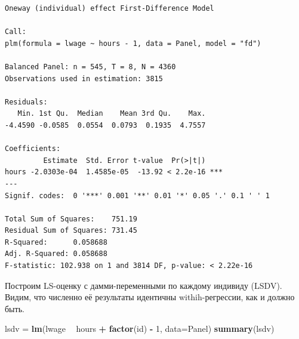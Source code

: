 \documentclass[]{book}
\newenvironment{Shaded}{\begin{snugshade}}{\end{snugshade}}
\newcommand{\DataTypeTok}[1]{\textcolor[rgb]{0.13,0.29,0.53}{#1}}
\newcommand{\DecValTok}[1]{\textcolor[rgb]{0.00,0.00,0.81}{#1}}
\newcommand{\KeywordTok}[1]{\textcolor[rgb]{0.13,0.29,0.53}{\textbf{#1}}}
\newcommand{\NormalTok}[1]{#1}
\newcommand{\OperatorTok}[1]{\textcolor[rgb]{0.81,0.36,0.00}{\textbf{#1}}}
\newcommand{\StringTok}[1]{\textcolor[rgb]{0.31,0.60,0.02}{#1}}
\begin{document}
\begin{verbatim}
Oneway (individual) effect First-Difference Model

Call:
plm(formula = lwage ~ hours - 1, data = Panel, model = "fd")

Balanced Panel: n = 545, T = 8, N = 4360
Observations used in estimation: 3815

Residuals:
   Min. 1st Qu.  Median    Mean 3rd Qu.    Max. 
-4.4590 -0.0585  0.0554  0.0793  0.1935  4.7557 

Coefficients:
         Estimate  Std. Error t-value  Pr(>|t|)    
hours -2.0303e-04  1.4585e-05  -13.92 < 2.2e-16 ***
---
Signif. codes:  0 '***' 0.001 '**' 0.01 '*' 0.05 '.' 0.1 ' ' 1

Total Sum of Squares:    751.19
Residual Sum of Squares: 731.45
R-Squared:      0.058688
Adj. R-Squared: 0.058688
F-statistic: 102.938 on 1 and 3814 DF, p-value: < 2.22e-16
\end{verbatim}

Построим LS-оценку с дамми-переменными по каждому индивиду (LSDV). Видим, что численно её результаты идентичны withih-регрессии, как и должно быть.

\begin{Shaded}
\begin{Highlighting}[]
\NormalTok{lsdv =}\StringTok{ }\KeywordTok{lm}\NormalTok{(lwage }\OperatorTok{~}\StringTok{ }\NormalTok{hours }\OperatorTok{+}\StringTok{ }\KeywordTok{factor}\NormalTok{(id) }\OperatorTok{-}\StringTok{ }\DecValTok{1}\NormalTok{, }\DataTypeTok{data=}\NormalTok{Panel)}
\KeywordTok{summary}\NormalTok{(lsdv)}
\end{Highlighting}
\end{Shaded}
\end{document}
